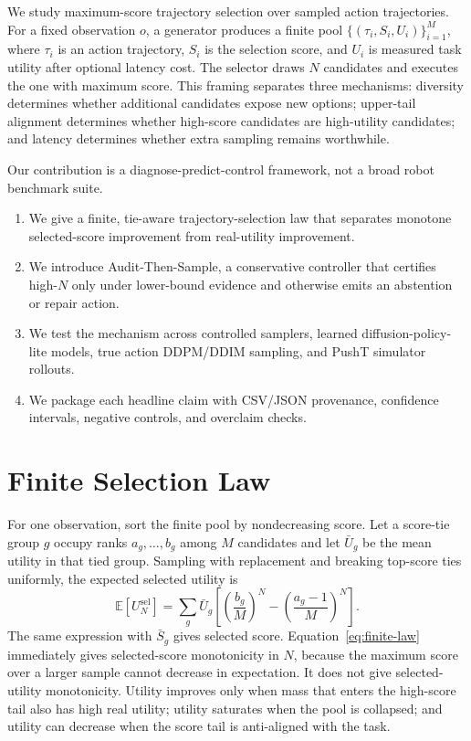 \documentclass{article}
\newcommand{\ats}{Audit-Then-Sample}
\begin{document}
We study maximum-score trajectory selection over sampled action trajectories. For a fixed observation $o$, a generator produces a finite pool $\{(\tau_i,S_i,U_i)\}_{i=1}^M$, where $\tau_i$ is an action trajectory, $S_i$ is the selection score, and $U_i$ is measured task utility after optional latency cost. The selector draws $N$ candidates and executes the one with maximum score. This framing separates three mechanisms: diversity determines whether additional candidates expose new options; upper-tail alignment determines whether high-score candidates are high-utility candidates; and latency determines whether extra sampling remains worthwhile.

Our contribution is a diagnose-predict-control framework, not a broad robot benchmark suite.

\begin{enumerate}
\item We give a finite, tie-aware trajectory-selection law that separates monotone selected-score improvement from real-utility improvement.
\item We introduce \ats{}, a conservative controller that certifies high-$N$ only under lower-bound evidence and otherwise emits an abstention or repair action.
\item We test the mechanism across controlled samplers, learned diffusion-policy-lite models, true action DDPM/DDIM sampling, and PushT simulator rollouts.
\item We package each headline claim with CSV/JSON provenance, confidence intervals, negative controls, and overclaim checks.
\end{enumerate}

\section{Finite Selection Law}

For one observation, sort the finite pool by nondecreasing score. Let a score-tie group $g$ occupy ranks $a_g,\ldots,b_g$ among $M$ candidates and let $\bar U_g$ be the mean utility in that tied group. Sampling with replacement and breaking top-score ties uniformly, the expected selected utility is
\begin{equation}
\mathbb{E}[U_{N}^{\mathrm{sel}}]
= \sum_g \bar U_g
\left[
\left(\frac{b_g}{M}\right)^N
- \left(\frac{a_g-1}{M}\right)^N
\right].
\label{eq:finite-law}
\end{equation}
The same expression with $\bar S_g$ gives selected score. Equation~\ref{eq:finite-law} immediately gives selected-score monotonicity in $N$, because the maximum score over a larger sample cannot decrease in expectation. It does not give selected-utility monotonicity. Utility improves only when mass that enters the high-score tail also has high real utility; utility saturates when the pool is collapsed; and utility can decrease when the score tail is anti-aligned with the task.
\end{document}
